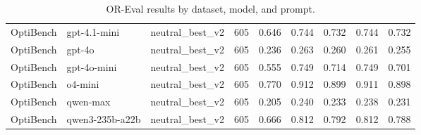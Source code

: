 \begin{table}[t]
\begin{tabular}{lllllllll}
OptiBench & gpt-4.1-mini & neutral\_best\_v2 & 605 & 0.646 & 0.744 & 0.732 & 0.744 & 0.732 \\
OptiBench & gpt-4o & neutral\_best\_v2 & 605 & 0.236 & 0.263 & 0.260 & 0.261 & 0.255 \\
OptiBench & gpt-4o-mini & neutral\_best\_v2 & 605 & 0.555 & 0.749 & 0.714 & 0.749 & 0.701 \\
OptiBench & o4-mini & neutral\_best\_v2 & 605 & 0.770 & 0.912 & 0.899 & 0.911 & 0.898 \\
OptiBench & qwen-max & neutral\_best\_v2 & 605 & 0.205 & 0.240 & 0.233 & 0.238 & 0.231 \\
OptiBench & qwen3-235b-a22b & neutral\_best\_v2 & 605 & 0.666 & 0.812 & 0.792 & 0.812 & 0.788 \\
\bottomrule
\end{tabular}
\caption{OR-Eval results by dataset, model, and prompt.}
\label{tab:or_eval_prompt}
\end{table}


